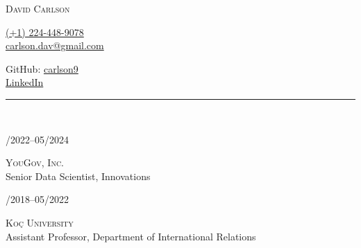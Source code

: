 \documentclass[12pt]{article}
\begin{document}
\begin{center}
\huge\textsc{David Carlson}
\end{center}
\vspace{1cm}

\begin{minipage}[t]{.5\textwidth}
\FlushLeft
\href{tel:(+1) 224-448-9078}{(+1) 224-448-9078}\\
\href{mailto:carlson.dav@gmail.com}{carlson.dav@gmail.com}
\end{minipage}
\begin{minipage}[t]{.45\textwidth}
\flushright
GitHub: \href{https://github.com/carlson9}{carlson9}\\
\href{https://www.linkedin.com/in/david-carlson-97a2322b/}{LinkedIn}
\end{minipage}
\vspace{.5cm}
\hrule




\vspace{.5cm}
\\
\vspace{.2cm}


\begin{minipage}[t]{.25\textwidth}
/2022--05/2024\\
\end{minipage}
\begin{minipage}[t]{.75\textwidth}
\FlushLeft
\textsc{YouGov, Inc.}\\
Senior Data Scientist, Innovations\\
\end{minipage}
\vspace{.35cm}

\begin{minipage}[t]{.25\textwidth}
/2018--05/2022\\
\end{minipage}
\begin{minipage}[t]{.75\textwidth}
\FlushLeft
\textsc{Ko\c{c} University}\\
Assistant Professor, Department of International Relations\\
\end{minipage}
\vspace{.35cm}

\vspace{.5cm}
\\
\vspace{.2cm}
\end{document}
